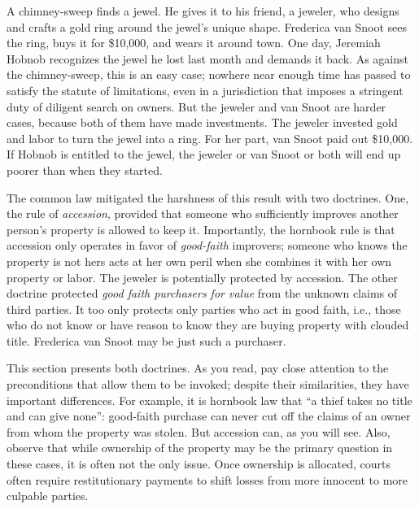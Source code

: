 A chimney-sweep finds a jewel. He gives it to his friend, a jeweler, who designs
and crafts a gold ring around the jewel's unique shape. Frederica van Snoot
sees the ring, buys it for \$10,000, and wears it around town. One day,
Jeremiah Hobnob recognizes the jewel he lost last month and demands it back. As
against the chimney-sweep, this is an easy case; nowhere near enough time has
passed to satisfy the statute of limitations, even in a jurisdiction that
imposes a stringent duty of diligent search on owners. But the jeweler and van
Snoot are harder cases, because both of them have made investments. The jeweler
invested gold and labor to turn the jewel into a ring. For her part, van Snoot
paid out \$10,000. If Hobnob is entitled to the jewel, the jeweler or van Snoot
or both will end up poorer than when they started.

The common law mitigated the harshness of this result with two doctrines. One,
the rule of \textit{accession}, provided that someone who sufficiently improves
another person's property is allowed to keep it. Importantly, the hornbook rule
is that accession only operates in favor of \textit{good-faith} improvers;
someone who knows the property is not hers acts at her own peril when she
combines it with her own property or labor. The jeweler is potentially
protected by accession. The other doctrine protected \textit{good faith
purchasers for value} from the unknown claims of third parties. It too only
protects only parties who act in good faith, i.e., those who do not know or
have reason to know they are buying property with clouded title. Frederica van
Snoot may be just such a purchaser. 

This section presents both doctrines. As you read, pay close attention to the
preconditions that allow them to be invoked; despite their similarities, they
have important differences. For example, it is hornbook law that ``a thief
takes no title and can give none'': good-faith purchase can never cut off the
claims of an owner from whom the property was stolen. But accession can, as you
will see. Also, observe that while ownership of the property may be the primary
question in these cases, it is often not the only issue. Once ownership is
allocated, courts often require restitutionary payments to shift losses from
more innocent to more culpable parties. 


